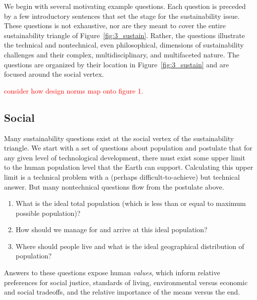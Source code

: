 \documentclass[12pt]{article}
\newcommand{\ins}[1]{\textcolor{red}{#1}}
\begin{document}
We begin with several motivating example questions.
Each question is preceded by a few introductory sentences that set the stage for the 
sustainability issue.
These questions is not exhaustive, nor are they meant to cover the entire sustainability triangle of 
Figure~\ref{fig:3_sustain}.
Rather, the questions illustrate the 
technical and nontechnical, even philosophical, dimensions of sustainability challenges
and their
complex, multidisciplinary, and multifaceted 
nature. 
The questions are organized by their location in Figure~\ref{fig:3_sustain}
and are focused around the social vertex.

\ins{consider how design norms map onto figure 1.}

\subsection{Social}
\label{sec:social}

Many sustainability questions exist at the social vertex of the sustainability triangle.
We start with a set of questions about population
and postulate that
for any given level of technological development, 
there must exist some upper limit to the human population level that the Earth can support. 
Calculating this upper limit is a technical problem with a 
(perhaps difficult-to-achieve)
but technical answer.  
But many nontechnical questions flow from the postulate above.
%
\begin{enumerate}

  \item What is the ideal total population (which is less than or equal to maximum possible population)? 

  \item How should we manage for and arrive at this ideal population?
  
  \item Where should people live and what is the ideal geographical distribution of population?

\end{enumerate}
%
Answers to these questions expose human \emph{values}, which
inform relative preferences for 
social justice, 
standards of living, 
environmental versus economic and social tradeoffs, and 
the relative importance of the means versus the end.
\end{document}

